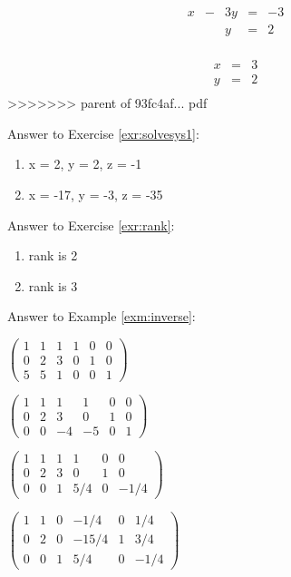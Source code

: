 \documentclass[]{book}
\theoremstyle{definition}
\theoremstyle{definition}
\theoremstyle{definition}
\theoremstyle{remark}
\begin{document}
\[\begin{matrix}
            x  & - & 3y & = & -3\\
               &   & y & = & 2\\            
            \end{matrix}\]

\[\begin{matrix}
            x & = & 3\\
            y & = & 2\\         
            \end{matrix}\]
>>>>>>> parent of 93fc4af... pdf

Answer to Exercise \ref{exr:solvesys1}:

\begin{enumerate}
\def\labelenumi{\arabic{enumi}.}
\item
  x = 2, y = 2, z = -1
\item
  x = -17, y = -3, z = -35
\end{enumerate}

Answer to Exercise \ref{exr:rank}:

\begin{enumerate}
\def\labelenumi{\arabic{enumi}.}
\item
  rank is 2
\item
  rank is 3
\end{enumerate}

Answer to Example \ref{exm:inverse}:

\(\left(\begin{array}{ccc|ccc}  1&1&1&1&0&0\\  0&2&3&0&1&0\\  5&5&1&0&0&1 \end{array} \right)\)

\(\left(\begin{array}{ccc|ccc}  1&1&1 &1 &0&0\\  0&2&3 &0 &1&0\\  0&0&-4&-5&0&1 \end{array} \right)\)

\(\left(\begin{array}{ccc|ccc}  1&1&1&1 &0&0\\  0&2&3&0 &1&0\\  0&0&1&5/4&0&-1/4 \end{array} \right)\)

\(\left(\begin{array}{ccc|ccc}  1&1&0&-1/4 &0&1/4\\  0&2&0&-15/4&1&3/4\\  0&0&1&5/4 &0&-1/4 \end{array} \right)\)
\end{document}
